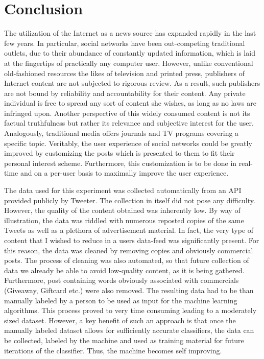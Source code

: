 \section{Conclusion}	
	The utilization of the Internet as a news source has expanded rapidly in the last few years. In particular, social networks have been out-competing traditional outlets, due to their abundance of constantly updated information, which is laid at the fingertips of practically any computer user. However, unlike conventional old-fashioned resources the likes of television and printed press, publishers of Internet content are not subjected to rigorous review. As a result, such publishers are not bound by reliability and accountability for their content. Any private individual is free to spread any sort of content she wishes, as long as no laws are infringed upon. Another perspective of this widely consumed content is not its factual truthfulness but rather its relevance and subjective interest for the user. Analogously, traditional media offers journals and TV programs covering a specific topic. Veritably, the user experience of social networks could be greatly improved by customizing the posts which is presented to them to fit their personal interest scheme. Furthermore, this customization is to be done in real-time and on a per-user basis to maximally improve the user experience.
	
	\par
	The data used for this experiment was collected automatically from an API provided publicly by Tweeter. The collection in itself did not pose any difficulty. However, the quality of the content obtained was inherently low. By way of illustration, the data was riddled with numerous reposted copies of the same Tweets as well as a plethora of advertisement material. In fact, the very type of content that I wished to reduce in a users data-feed was significantly present. For this reason, the data was cleaned by removing copies and obviously commercial posts. The process of cleaning was also automated, so that future collection of data we already be able to avoid low-quality content, as it is being gathered. Furthermore, post containing words obviously associated with commercials (Giveaway, Giftcard etc.) were also removed. The resulting data had to be than manually labeled by a person to be used as input for the machine learning algorithms. This process proved to very time consuming leading to a moderately sized dataset. However, a key benefit of such an approach is that once the manually labeled dataset allows for sufficiently accurate classifiers, the data can be collected, labeled by the machine and used as training material for future iterations of the classifier. Thus, the machine becomes self improving.
	
